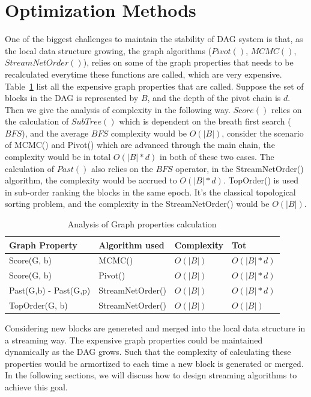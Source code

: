 \section{Optimization Methods}
One of the biggest challenges to maintain the stability of DAG system is that, 
as the local data structure growing, the graph algorithms ($Pivot()$, $MCMC()$, $StreamNetOrder()$), 
relies on some of the graph properties that needs to be recalculated everytime these functions are called,
which are very expensive. 
Table~\ref{tab:properties} list all the expensive graph properties that are called. 
Suppose the set of blocks in the DAG is represented by $B$, and the depth of the pivot chain is $d$.
Then we give the analysis of complexity in the following way. 
$Score()$ relies on the calculation of $SubTree()$ which is dependent on the breath first search ($BFS$), and the average $BFS$
complexity would be $O(|B|)$, consider the scenario of MCMC() and Pivot() which are advanced through the main chain,
the complexity would be in total $O(|B|*d)$ in both of these two cases.
The calculation of $Past()$ also relies on the $BFS$ operator, in the StreamNetOrder() algorithm, the complexity would be 
accrued to $O(|B| * d)$.
TopOrder() is used in sub-order ranking the blocks in the same epoch.
It's the classical topological sorting problem, and the complexity in the StreamNetOrder() would be $O(|B|)$.

\begin{table}[]
\caption {Analysis of Graph properties calculation} \label{tab:properties}
\begin{center}
\begin{tabular}{|l|l|l|l|}
\hline
Graph Property        & Algorithm used   & Complexity & Tot \\ \hline
Score(G, b)           & MCMC()           & $O(|B|)$              & $O(|B|*d)$  \\ \hline
Score(G, b)           & Pivot()          & $O(|B|)$              & $O(|B|*d)$  \\ \hline
Past(G,b) - Past(G,p) & StreamNetOrder() & $O(|B|)$          & $O(|B|*d)$  \\ \hline
TopOrder(G, b)        & StreamNetOrder() & $O(|B|)$              & $O(|B|)$    \\ \hline
\end{tabular}
\end{center}
\end{table}



Considering new blocks are genereted and merged into the local data structure in a streaming way.
The expensive graph properties could be maintained dynamically as the DAG grows.
Such that the complexity of calculating these properties would be armortized to each time a new block is generated or merged.
In the following sections, we will discuss how to design streaming algorithms to achieve this goal.


